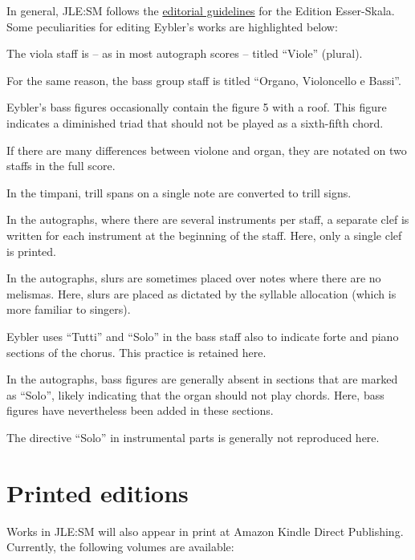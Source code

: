 \documentclass{ees}
\begin{document}
In general, JLE:SM follows the \href{https://edition.esser-skala.at/about/editorial-guidelines/}{editorial guidelines} for the Edition Esser-Skala. Some peculiarities for editing Eybler's works are highlighted below:

\begin{bulletlist}
  \item The viola staff is – as in most autograph scores – titled “Viole” (plural).
  \item For the same reason, the bass group staff is titled “Organo, Violoncello e Bassi”.
  \item Eybler's bass figures occasionally contain the figure 5 with a roof. This figure indicates a diminished triad that should not be played as a sixth-fifth chord.
  \item If there are many differences between violone and organ, they are notated on two staffs in the full score.
  \item In the timpani, trill spans on a single note are converted to trill signs.
  \item In the autographs, where there are several instruments per staff, a separate clef is written for each instrument at the beginning of the staff. Here, only a single clef is printed.
  \item In the autographs, slurs are sometimes placed over notes where there are no melismas. Here, slurs are placed as dictated by the syllable allocation (which is more familiar to singers).
  \item Eybler uses “Tutti” and “Solo” in the bass staff also to indicate forte and piano sections of the chorus. This practice is retained here.
  \item In the autographs, bass figures are generally absent in sections that are marked as “Solo”, likely indicating that the organ should not play chords. Here, bass figures have nevertheless been added in these sections.
  \item The directive “Solo” in instrumental parts is generally not reproduced here.
\end{bulletlist}

\clearpage
\section{Printed editions}

Works in JLE:SM will also appear in print at Amazon Kindle Direct Publishing. Currently, the following volumes are available:
\end{document}

